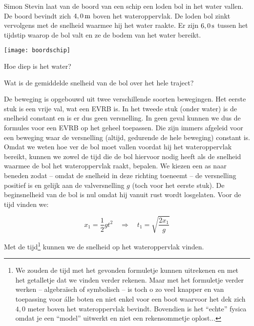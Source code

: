 \documentclass{ximera}
\begin{document}
\begin{exercise}
Simon Stevin laat van de boord van een schip een loden bol in het water vallen. De \mbox{boord} bevindt zich $4,0\rm\,m$ boven het wateroppervlak. De loden bol zinkt vervolgens met de snelheid waarmee hij het water raakte. Er zijn $6,0\rm\,s$ tussen het tijdstip waarop de bol valt en ze de bodem van het water bereikt.

\begin{image}
	\texttt{[image: boordschip]}
\end{image}

\begin{question} Hoe diep is het water? \end{question}
\begin{question} Wat is de gemiddelde snelheid van de bol over het hele traject? \end{question}

\begin{oplossing}
De beweging is opgebouwd uit twee verschillende soorten bewegingen. Het eerste stuk is een vrije val, wat een EVRB is. In het tweede stuk (onder water) is de snelheid constant en is er dus geen versnelling. In geen geval kunnen we dus de formules voor een EVRB op het geheel toepassen. Die zijn immers afgeleid voor een beweging waar de versnelling (altijd, gedurende de hele beweging) constant is. \\

Omdat we weten hoe ver de bol moet vallen voordat hij het wateroppervlak bereikt, kunnen we zowel de tijd die de bol hiervoor nodig heeft als de snelheid waarmee de bol het wateroppervlak raakt, bepalen. We kiezen een as naar beneden zodat -- omdat de snelheid in deze richting toeneemt -- de versnelling positief is en gelijk aan de valversnelling $g$ (toch voor het eerste stuk). De beginsnelheid van de bol is nul omdat hij vanuit rust wordt losgelaten. Voor de tijd vinden we:

\[
x_1=\frac{1}{2}gt^2\quad\Rightarrow\quad t_1=\sqrt{\frac{2x_1}{g}}
\]

Met de tijd\footnote{We zouden de tijd met het gevonden formuletje kunnen uitrekenen en met het getalletje dat we vinden verder rekenen. Maar met het formuletje verder werken -- algebra\"isch of symbolisch -- is toch o zo veel knapper en van toepassing voor \'alle boten en niet enkel voor een boot waarvoor het dek zich $4,0$ meter boven het wateroppervlak bevindt. Bovendien is het ``echte'' fysica omdat je een ``model'' uitwerkt en niet een rekensommetje oplost...} kunnen we de snelheid op het wateroppervlak vinden.


\end{oplossing}
\end{exercise}
\end{document}
